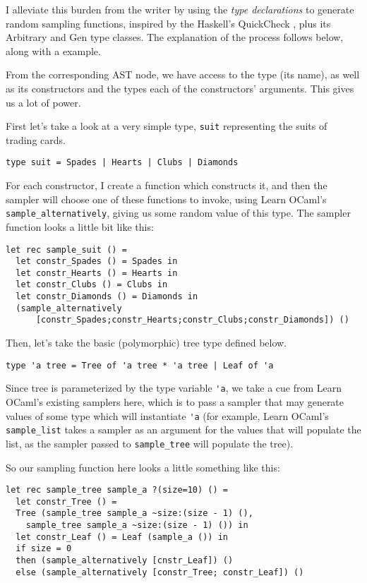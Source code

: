 \documentclass[11pt]{article}
\begin{document}
I alleviate this burden from the writer by using the \textit{type declarations} to generate random sampling functions, inspired by the Haskell's QuickCheck \cite{claessen2011quickcheck}, plus its Arbitrary and Gen type classes. The explanation of the process follows below, along with a example.

From the corresponding AST node, we have access to the type (its name), as well as its constructors and the types each of the constructors' arguments. This gives us a lot of power.

First let's take a look at a very simple type, \verb+suit+ representing the suits of trading cards.

\begin{lstlisting}
type suit = Spades | Hearts | Clubs | Diamonds
\end{lstlisting}

For each constructor, I create a function which constructs it, and then the sampler will choose one of these functions to invoke, using Learn OCaml's \verb+sample_alternatively+, giving us some random value of this type. The sampler function looks a little bit like this:

\begin{lstlisting}[basicstyle=\footnotesize]
let rec sample_suit () =
  let constr_Spades () = Spades in
  let constr_Hearts () = Hearts in
  let constr_Clubs () = Clubs in
  let constr_Diamonds () = Diamonds in
  (sample_alternatively
      [constr_Spades;constr_Hearts;constr_Clubs;constr_Diamonds]) ()
\end{lstlisting}

Then, let's take the basic (polymorphic) tree type defined below.

\begin{lstlisting}
type 'a tree = Tree of 'a tree * 'a tree | Leaf of 'a
\end{lstlisting}

Since tree is parameterized by the type variable \verb+'a+, we take a cue from Learn OCaml's existing samplers here, which is to pass a sampler that may generate values of some type which will instantiate \verb+'a+ (for example, Learn OCaml's \verb+sample_list+ takes a sampler as an argument for the values that will populate the list, as the sampler passed to \verb+sample_tree+ will populate the tree).

So our sampling function here looks a little something like this:

\begin{lstlisting}
let rec sample_tree sample_a ?(size=10) () =
  let constr_Tree () =
  Tree (sample_tree sample_a ~size:(size - 1) (),
    sample_tree sample_a ~size:(size - 1) ()) in
  let constr_Leaf () = Leaf (sample_a ()) in
  if size = 0
  then (sample_alternatively [cnstr_Leaf]) ()
  else (sample_alternatively [constr_Tree; constr_Leaf]) ()
\end{lstlisting}
\end{document}
